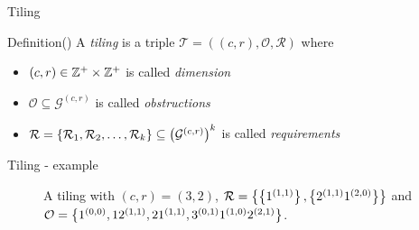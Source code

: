 \begin{frame}{Tiling}
    \begin{block}{Definition\hfill()}
        A \emph{tiling} is a triple $\mathcal{T} = ((c,r), \mathcal{O}, \mathcal{R})$ where
        \begin{itemize}
            \item $(c,r) \in \mathbb{Z}^+ \times \mathbb{Z}^+$  is called \emph{dimension}
            \item $\mathcal{O} \subseteq \mathcal{G}^{(c,r)}$ is called \emph{obstructions}
            \item $\mathcal{R}=\left\{\mathcal{R}_1,\mathcal{R}_2,\dotsc,\mathcal{R}_k\right\} \subseteq \left(\mathcal{G}^{(c,r)}\right)^k$ is called \emph{requirements}
        \end{itemize}
    \end{block}
\end{frame}
\begin{frame}{Tiling - example}
    \begin{figure}
        \centering
        
        \caption{A tiling with $(c,r) = (3,2)$, $\mathcal{R} = \left\{\left\{1^{(1,1)}\right\},\left\{2^{(1,1)}1^{(2,0)}\right\}\right\}$ and $\mathcal{O} = \left\{1^{(0,0)},12^{(1,1)},21^{(1,1)},3^{(0,1)}1^{(1,0)}2^{(2,1)}\right\}$.}
    \end{figure}
\end{frame}